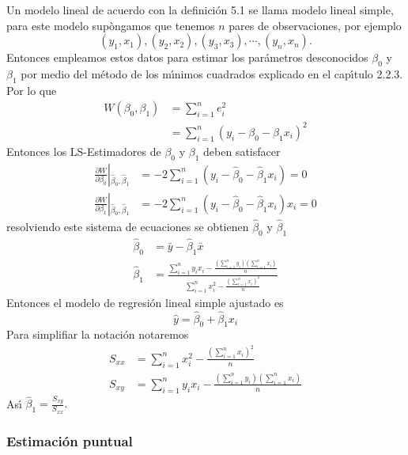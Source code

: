 Un modelo lineal de acuerdo con la definici\'{o}n 5.1 se llama modelo lineal
simple, para este modelo sup\`{o}ngamos que tenemos $n$ pares de
observaciones, por ejemplo
\[
\left(  y_{1},x_{1}\right)  ,\left(  y_{2},x_{2}\right)  ,\left(  y_{3}%
,x_{3}\right)  ,\cdots,\left(  y_{n},x_{n}\right)  .
\]
Entonces empleamos estos datos para estimar los par\'{a}metros desconocidos
$\beta_{0}$ y $\beta_{1}$ por medio del m\'{e}todo de los m\'{\i}nimos
cuadrados explicado en el cap\'{\i}tulo 2.2.3. Por lo que
\begin{align*}
W\left(  \beta_{0},\beta_{1}\right)   &  =\sum_{i=1}^{n}e_{i}^{2}\\
&  =\sum_{i=1}^{n}\left(  y_{i}-\beta_{0}-\beta_{1}x_{i}\right)  ^{2}%
\end{align*}
Entonces los LS-Estimadores de $\beta_{0}$ y $\beta_{1}$ deben satisfacer
\begin{align*}
\frac{\partial W}{\partial\beta_{0}}\left|  _{\hat{\beta}_{0},\hat{\beta}_{1}%
}\right.   &  =-2\sum_{i=1}^{n}\left(  y_{i}-\hat{\beta}_{0}-\hat{\beta}%
_{1}x_{i}\right)  =0\\
\frac{\partial W}{\partial\beta_{1}}\left|  _{\hat{\beta}_{0},\hat{\beta}_{1}%
}\right.   &  =-2\sum_{i=1}^{n}\left(  y_{i}-\hat{\beta}_{0}-\hat{\beta}%
_{1}x_{i}\right)  x_{i}=0
\end{align*}
resolviendo este sistema de ecuaciones se obtienen $\hat{\beta}_{0}$ y
$\hat{\beta}_{1}$
\begin{align*}
\hat{\beta}_{0}  &  =\bar{y}-\hat{\beta}_{1}\bar{x}\\
\hat{\beta}_{1}  &  =\frac{\sum_{i=1}^{n}y_{i}x_{i}-\frac{\left(  \sum
_{i=1}^{n}y_{i}\right)  \left(  \sum_{i=1}^{n}x_{i}\right)  }{n}}{\sum
_{i=1}^{n}x_{i}^{2}-\frac{\left(  \sum_{i=1}^{n}x_{i}\right)  ^{2}}{n}}%
\end{align*}
Entonces el modelo de regresi\'{o}n lineal simple ajustado es
\[
\hat{y}=\hat{\beta}_{0}+\hat{\beta}_{1}x_{i}%
\]
Para simplifiar la notaci\'{o}n notaremos
\begin{align*}
S_{xx}  &  =\sum_{i=1}^{n}x_{i}^{2}-\frac{\left(  \sum_{i=1}^{n}x_{i}\right)
^{2}}{n}\\
S_{xy}  &  =\sum_{i=1}^{n}y_{i}x_{i}-\frac{\left(  \sum_{i=1}^{n}y_{i}\right)
\left(  \sum_{i=1}^{n}x_{i}\right)  }{n}%
\end{align*}
As\'{\i} $\hat{\beta}_{1}=\frac{S_{xy}}{S_{xx}}.$

\subsubsection{Estimaci\'{o}n puntual}

